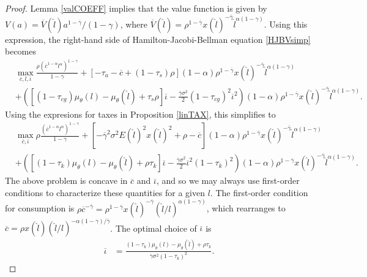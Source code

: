 \documentclass[11pt]{article}
\theoremstyle{plain}
\begin{document}
\begin{proof}
Lemma \ref{valCOEFF} implies that the value function is given by $V(a) = \overline{V}(\hat{l})a^{1-\overline{\gamma}}/(1-\gamma)$, where $\overline{V}(\hat{l}) = \rho^{1-\overline{\gamma}} x(\hat{l})^{-\overline{\gamma}}\hat{l}^{\alpha(1-\gamma)}$. Using this expression, the right-hand side of Hamilton-Jacobi-Bellman equation \eqref{HJBVsimp} becomes
\begin{equation}
\begin{aligned}
 & \max_{\overline{c},l,\overline{\iota}} \frac{\rho(\overline{c}^{1-\alpha}l^{\alpha})^{1-\gamma}}{1-\gamma} + [ - \tau_a - \overline{c} + (1-\tau_s)\rho](1-\alpha)\rho^{1-\overline{\gamma}} x(\hat{l})^{-\overline{\gamma}}\hat{l}^{\alpha(1-\gamma)}
\\ & +  {\left({\left[(1 - \tau_{cg})\mu_{\theta}(l) - \mu_{\theta}(\hat{l}) + \tau_s\rho\right]}\overline{\iota} - \frac{\overline{\gamma}\sigma^2}{2}(1-\tau_{cg})^2\overline{\iota}^2\right)}(1-\alpha)\rho^{1-\overline{\gamma}} x(\hat{l})^{-\overline{\gamma}}\hat{l}^{\alpha(1-\gamma)}.
\end{aligned}
\label{HJBVsimp2}
\end{equation}
Using the expresions for taxes in Proposition \ref{linTAX}, this simplifies to
\begin{align*}
 & \max_{\overline{c},\overline{\iota}}\rho \frac{(\overline{c}^{1-\alpha}l^{\alpha})^{1-\gamma}}{1-\gamma} + [- \overline{\gamma}^2\sigma^2E(\hat{l})^2x(\hat{l})^2 + \rho - \overline{c}](1-\alpha)\rho^{1-\overline{\gamma}} x(\hat{l})^{-\overline{\gamma}}\hat{l}^{\alpha(1-\gamma)}
\\ & + {\left({\left[(1 - \tau_k)\mu_{\theta}(l) - \mu_{\theta}(\hat{l}) + \rho\tau_k\right]}\overline{\iota} - \frac{\overline{\gamma}\sigma^2}{2}\overline{\iota}^2(1-\tau_k)^2\right)}(1-\alpha)\rho^{1-\overline{\gamma}} x(\hat{l})^{-\overline{\gamma}}\hat{l}^{\alpha(1-\gamma)}.
\end{align*}
The above problem is concave in $\overline{c}$ and $\overline{\iota}$, and so we may always use first-order conditions to characterize these quantities for a given $l$. The first-order condition for consumption is $\rho \overline{c}^{-\overline{\gamma}} = \rho^{1-\overline{\gamma}} x(\hat{l})^{-\overline{\gamma}}(\hat{l}/l)^{\alpha(1-\gamma)}$, which rearranges to $\overline{c} = \rho x(\hat{l})(\hat{l}/l)^{-\alpha(1-\gamma)/\overline{\gamma}}$. The optimal choice of $\overline{\iota}$ is 
\begin{align*}
\overline{\iota} & = \frac{(1 - \tau_k)\mu_{\theta}(l) - \mu_{\theta}(\hat{l}) + \rho\tau_k}{\overline{\gamma}\sigma^2(1-\tau_k)^2}.

\end{align*}
\end{proof}
\end{document}

